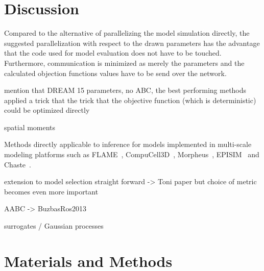 \documentclass[10pt,letterpaper]{article}
\begin{document}
\section*{Discussion}

Compared to the alternative of parallelizing the model simulation directly, the suggested parallelization with respect to the drawn parameters has the advantage that the code used for model evaluation does not have to be touched. Furthermore, communication is minimized as merely the parameters and the calculated objection functions values have to be send over the network.

mention that DREAM 15 parameters, no ABC, the best performing methods applied a trick that the trick that the objective function (which is deterministic) could be optimized directly

spatial moments

Methods directly applicable to inference for models implemented in multi-scale modeling platforms such as FLAME~\cite{RichmondWal2010}, CompuCell3D~\cite{SwatTho2012}, Morpheus~\cite{StarrussBac2014}, EPISIM~\cite{SutterlinKol2013} and Chaste~\cite{MiramsArt2013}.

extension to model selection straight forward -> Toni paper
but choice of metric becomes even more important

AABC -> BuzbasRos2013

surrogates / Gaussian processes



\section*{Materials and Methods}

\end{document}
